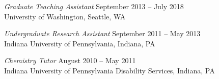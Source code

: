 \documentclass[10pt]{res} %
\begin{document}
\begin{resume}
{\sl Graduate Teaching Assistant} \hfill September 2013 -- July 2018 \\
University of Washington, Seattle, WA 

{\sl Undergraduate Research Assistant} \hfill September 2011 -- May 2013 \\
Indiana University of Pennsylvania, Indiana, PA

{\sl Chemistry Tutor} \hfill August 2010 -- May 2011 \\
Indiana University of Pennsylvania Disability Services, Indiana, PA 


\end{resume}
\end{document}
